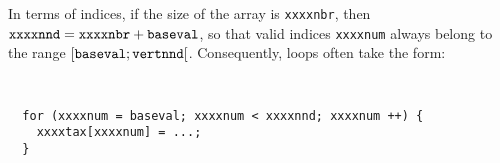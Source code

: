 In terms of indices, if the size of the array is \texttt{xxxxnbr},
then
$\mbox{\texttt{xxxxnnd}} = \mbox{\texttt{xxxxnbr}} + \mbox{\texttt{baseval}}$,
so that valid indices \texttt{xxxxnum} always belong to the range
$[\mbox{\texttt{baseval}};\mbox{\texttt{vertnnd}}[$. Consequently,
loops often take the form:
\begin{center}
{\renewcommand{\baselinestretch}{1.05}
\footnotesize\tt
\begin{verbatim}
  for (xxxxnum = baseval; xxxxnum < xxxxnnd; xxxxnum ++) {
    xxxxtax[xxxxnum] = ...;
  }
\end{verbatim}
}
\end{center}
